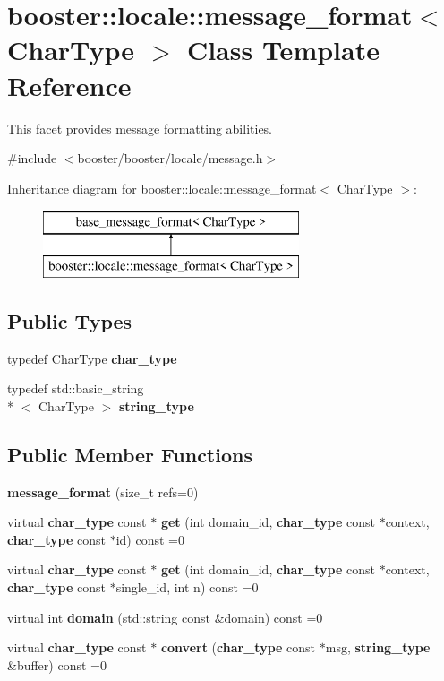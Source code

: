 \section{booster\-:\-:locale\-:\-:message\-\_\-format$<$ Char\-Type $>$ Class Template Reference}
\label{classbooster_1_1locale_1_1message__format}


This facet provides message formatting abilities.  




{\ttfamily \#include $<$booster/booster/locale/message.\-h$>$}

Inheritance diagram for booster\-:\-:locale\-:\-:message\-\_\-format$<$ Char\-Type $>$\-:\begin{figure}[H]
\begin{center}
\leavevmode
\includegraphics[height=2.000000cm]{classbooster_1_1locale_1_1message__format}
\end{center}
\end{figure}
\subsection*{Public Types}
\begin{DoxyCompactItemize}
\item 
typedef Char\-Type {\bf char\-\_\-type}
\item 
typedef std\-::basic\-\_\-string\\*
$<$ Char\-Type $>$ {\bf string\-\_\-type}
\end{DoxyCompactItemize}
\subsection*{Public Member Functions}
\begin{DoxyCompactItemize}
\item 
{\bf message\-\_\-format} (size\-\_\-t refs=0)
\item 
virtual {\bf char\-\_\-type} const $\ast$ {\bf get} (int domain\-\_\-id, {\bf char\-\_\-type} const $\ast$context, {\bf char\-\_\-type} const $\ast$id) const =0
\item 
virtual {\bf char\-\_\-type} const $\ast$ {\bf get} (int domain\-\_\-id, {\bf char\-\_\-type} const $\ast$context, {\bf char\-\_\-type} const $\ast$single\-\_\-id, int n) const =0
\item 
virtual int {\bf domain} (std\-::string const \&domain) const =0
\item 
virtual {\bf char\-\_\-type} const $\ast$ {\bf convert} ({\bf char\-\_\-type} const $\ast$msg, {\bf string\-\_\-type} \&buffer) const =0
\end{DoxyCompactItemize}


